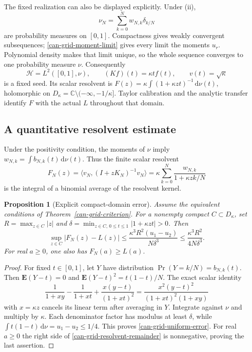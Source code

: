 \documentclass[11pt,a4paper]{article}
\numberwithin{equation}{section}
\newtheorem{proposition}[theorem]{Proposition}
\theoremstyle{definition}
\theoremstyle{remark}
\newcommand{\C}{\mathbb C}
\newcommand{\HH}{\mathcal H}
\newcommand{\ip}[2]{\langle #1,#2\rangle}
\newcommand{\dd}{\,\mathrm d}
\begin{document}
The fixed realization can also be displayed explicitly. Under (ii),
\begin{equation}\label{can-grid-measures}
\nu_N=\sum_{k=0}^Nw_{N,k}\delta_{k/N}
\end{equation}
are probability measures on $[0,1]$. Compactness gives weakly convergent
subsequences; \eqref{can-grid-moment-limit} gives every limit the moments
$u_r$. Polynomial density makes that limit unique, so the whole sequence
converges to one probability measure $\nu$. Consequently
\begin{equation}\label{can-grid-fixed-seed}
\HH=L^2([0,1],\nu),\qquad (Kf)(t)=\kappa t f(t),\qquad
v(t)=\sqrt\kappa
\end{equation}
is a fixed seed. Its scalar resolvent is
$F(z)=\kappa\int(1+\kappa zt)^{-1}\dd\nu(t)$, holomorphic on
$D_\kappa=\C\setminus(-\infty,-1/\kappa]$. Taylor calibration and the
analytic transfer identify $F$ with the actual $L$ throughout that domain.

\subsection{A quantitative resolvent estimate}

Under the positivity condition, the moments of $\nu$ imply
$w_{N,k}=\int b_{N,k}(t)\dd\nu(t)$. Thus the finite scalar resolvent
\begin{equation}\label{can-grid-resolvents}
F_N(z)=\ip{v_N}{(I+zK_N)^{-1}v_N}
=\kappa\sum_{k=0}^N\frac{w_{N,k}}{1+\kappa zk/N}
\end{equation}
is the integral of a binomial average of the resolvent kernel.

\begin{proposition}[Explicit compact-domain error]\label{can-grid-rate}
Assume the equivalent conditions of Theorem~\ref{can-grid-criterion}.
For a nonempty compact $C\subset D_\kappa$, set
$R=\max_{z\in C}|z|$ and
$\delta=\min_{z\in C,\,0\leq t\leq1}|1+\kappa zt|>0$. Then
\begin{equation}\label{can-grid-uniform-error}
\sup_{z\in C}|F_N(z)-L(z)|
\leq\frac{\kappa^3R^2(u_1-u_2)}{N\delta^3}
\leq\frac{\kappa^3R^2}{4N\delta^3}.
\end{equation}
For real $a\geq0$, one also has $F_N(a)\geq L(a)$.
\end{proposition}
\begin{proof}
For fixed $t\in[0,1]$, let $Y$ have distribution
$\Pr(Y=k/N)=b_{N,k}(t)$. Then
$\mathbf E(Y-t)=0$ and $\mathbf E(Y-t)^2=t(1-t)/N$.
The exact scalar identity
\begin{equation}\label{can-grid-resolvent-remainder}
\frac1{1+xy}-\frac1{1+xt}+\frac{x(y-t)}{(1+xt)^2}
=\frac{x^2(y-t)^2}{(1+xt)^2(1+xy)}
\end{equation}
with $x=\kappa z$ cancels its linear term after averaging in $Y$.
Integrate against $\nu$ and multiply by $\kappa$. Each denominator
factor has modulus at least $\delta$, while
$\int t(1-t)\dd\nu=u_1-u_2\leq1/4$. This proves
\eqref{can-grid-uniform-error}. For real $a\geq0$ the right side of
\eqref{can-grid-resolvent-remainder} is nonnegative, proving the last
assertion.
\end{proof}
\end{document}
